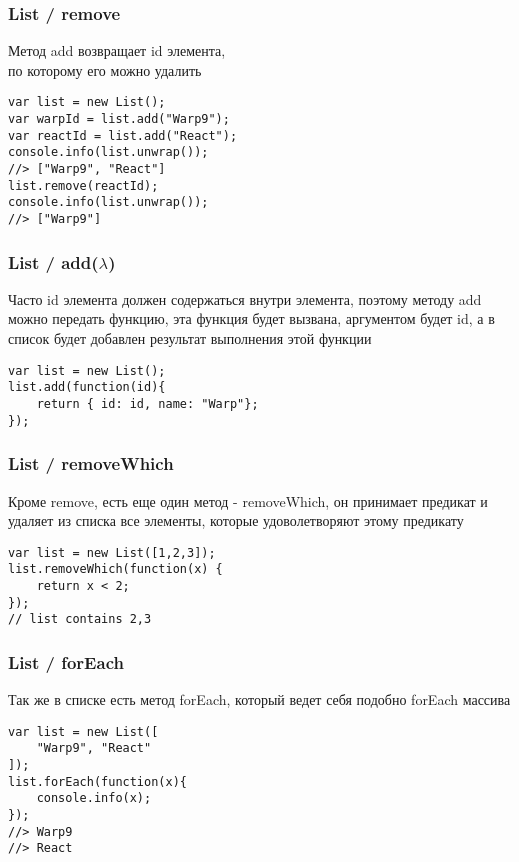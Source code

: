 \documentclass[xetex]{beamer}
\begin{document}
\lstset{
  xleftmargin=.1\textwidth, xrightmargin=.1\textwidth
}


\begin{frame}[fragile]
\frametitle{List / remove}
Метод add возвращает id элемента, \\ по которому его можно удалить

\vspace{6mm}
\begin{lstlisting}
var list = new List();
var warpId = list.add("Warp9");
var reactId = list.add("React");
console.info(list.unwrap()); 
//> ["Warp9", "React"]
list.remove(reactId);
console.info(list.unwrap()); 
//> ["Warp9"]
\end{lstlisting}
\end{frame}


\begin{frame}[fragile]
\frametitle{List / add($\lambda$)}
Часто id элемента должен содержаться внутри элемента, поэтому методу add можно передать функцию, эта функция будет вызвана, аргументом будет id, а в список будет добавлен результат выполнения этой функции

\vspace{10mm}
\begin{lstlisting}
var list = new List();
list.add(function(id){
    return { id: id, name: "Warp"};
});
\end{lstlisting}
\end{frame}


\begin{frame}[fragile]
\frametitle{List / removeWhich}
Кроме remove, есть еще один метод - removeWhich, он принимает предикат и удаляет из списка все элементы, которые удоволетворяют этому предикату

\vspace{10mm}
\begin{lstlisting}
var list = new List([1,2,3]);
list.removeWhich(function(x) { 
    return x < 2;
});
// list contains 2,3
\end{lstlisting}
\end{frame}


\begin{frame}[fragile]
\frametitle{List / forEach}
Так же в списке есть метод forEach, который ведет себя подобно forEach массива

\vspace{10mm}
\begin{lstlisting}
var list = new List([
    "Warp9", "React"
]);
list.forEach(function(x){
    console.info(x); 
});
//> Warp9
//> React
\end{lstlisting}
\end{frame}
\end{document}
